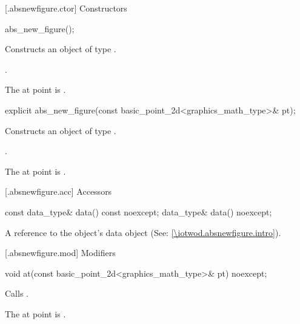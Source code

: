  [\iotwod.absnewfigure.ctor] {Constructors}%

%
\begin{itemdecl}
abs_new_figure();
\end{itemdecl}
\begin{itemdescr}
\pnum
\effects Constructs an object of type .

\pnum
\postconditions {}.

\pnum
\remarks The at point is .
\end{itemdescr}

%
\begin{itemdecl}
explicit abs_new_figure(const basic_point_2d<graphics_math_type>& pt);
\end{itemdecl}
\begin{itemdescr}
\pnum
\effects Constructs an object of type .

\pnum
\postconditions {}.

\pnum
\remarks The at point is .
\end{itemdescr}

 [\iotwod.absnewfigure.acc] {Accessors}%

%
\begin{itemdecl}
const data_type& data() const noexcept;
data_type& data() noexcept;
\end{itemdecl}
\begin{itemdescr}
\pnum
\returns A reference to the  object's data object (See: \ref{\iotwod.absnewfigure.intro}).
\end{itemdescr}

 [\iotwod.absnewfigure.mod] {Modifiers}%

%
\begin{itemdecl}
void at(const basic_point_2d<graphics_math_type>& pt) noexcept;
\end{itemdecl}
\begin{itemdescr}
\pnum
\effects Calls .

\pnum
\remarks The at point is .
\end{itemdescr}

